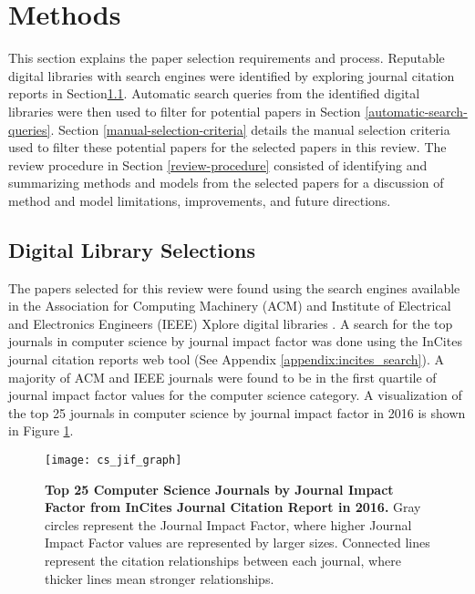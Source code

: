 

\section{Methods} \label{methods}
This section explains the paper selection requirements and process. Reputable digital libraries with search engines were identified by exploring journal citation reports in Section\ref{digital-library-selections}. Automatic search queries from the identified digital libraries were then used to filter for potential papers in Section \ref{automatic-search-queries}. Section \ref{manual-selection-criteria} details the manual selection criteria used to filter these potential papers for the selected papers in this review. The review procedure in Section \ref{review-procedure} consisted of identifying and summarizing methods and models from the selected papers for a discussion of method and model limitations, improvements, and future directions.


\subsection{Digital Library Selections} \label{digital-library-selections}

The papers selected for this review were found using the search engines available in the Association for Computing Machinery (ACM) and Institute of Electrical and Electronics Engineers (IEEE) Xplore digital libraries \cite{ACM:2017,IEEE:2017}. A search for the top journals in computer science by journal impact factor \cite{Garfield:2006b} was done using the InCites journal citation reports web tool \cite{Clarivate:2017a} (See Appendix \ref{appendix:incites_search}). A majority of ACM and IEEE journals were found to be in the first quartile of journal impact factor values for the computer science category. A visualization of the top 25 journals in computer science by journal impact factor in 2016 is shown in Figure \ref{figure:cs_jif_graph}.

\begin{figure}[!t]
	\centering
	\texttt{[image: cs\_jif\_graph]}
	\caption{\textbf{Top 25 Computer Science Journals by Journal Impact Factor from InCites Journal Citation Report in 2016.} Gray circles represent the Journal Impact Factor, where higher Journal Impact Factor values are represented by larger sizes. Connected lines represent the citation relationships between each journal, where thicker lines mean stronger relationships.}
	\label{figure:cs_jif_graph}
\end{figure}


